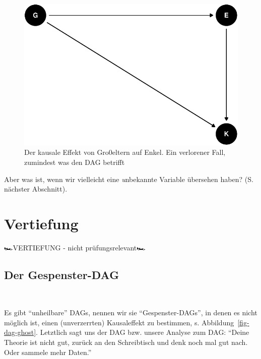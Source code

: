 \documentclass[
  a4paper,
  DIV=11]{scrreprt}
\theoremstyle{definition}
\theoremstyle{remark}
\begin{document}
\begin{figure}

{\centering \includegraphics{./kausal_files/figure-pdf/fig-dag-grannies-1.pdf}

}

\caption{\label{fig-dag-grannies}Der kausale Effekt von Gro0eltern auf
Enkel. Ein verlorener Fall, zumindest was den DAG betrifft}

\end{figure}

Aber was ist, wenn wir vielleicht eine \emph{u}nbekannte Variable
übersehen haben? (S. nächster Abschnitt). 👻

\hypertarget{vertiefung-4}{%
\section{Vertiefung}\label{vertiefung-4}}

🏎️VERTIEFUNG - nicht prüfungsrelevant🏎️

\hypertarget{der-gespenster-dag}{%
\subsection{Der Gespenster-DAG}\label{der-gespenster-dag}}

👻

Es gibt ``unheilbare'' DAGs, nennen wir sie ``Gespenster-DAGs'', in
denen es nicht möglich ist, einen (unverzerrten) Kausaleffekt zu
bestimmen, s. Abbildung~\ref{fig-dag-ghost}. Letztlich sagt uns der DAG
bzw. unsere Analyse zum DAG: ``Deine Theorie ist nicht gut, zurück an
den Schreibtisch und denk noch mal gut nach. Oder sammele mehr Daten.''
\end{document}

